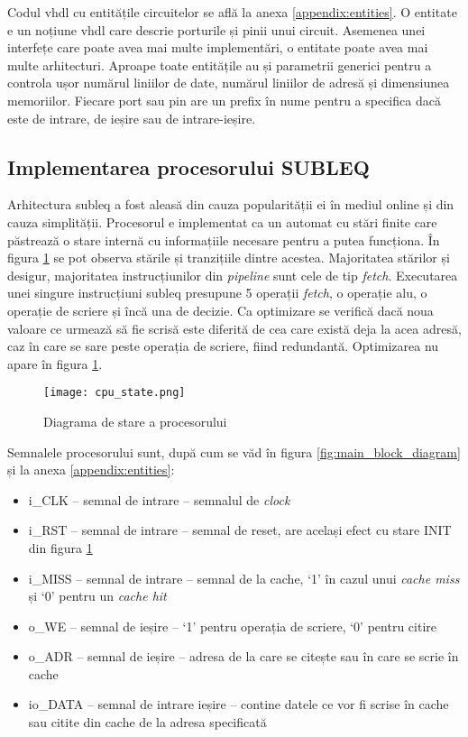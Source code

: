 \documentclass[../main.tex]{subfiles}
\begin{document}
Codul \acrshort{vhdl} cu entitățile circuitelor se află la anexa \ref{appendix:entities}. O entitate e un noțiune \acrshort{vhdl}
care descrie porturile și pinii unui circuit. Asemenea unei interfețe care poate avea mai multe implementări, o entitate poate
avea mai multe arhitecturi. Aproape toate entitățile au și parametrii generici pentru a controla ușor numărul liniilor de date,
numărul liniilor de adresă și dimensiunea memoriilor. Fiecare port sau pin are un prefix în nume pentru a specifica dacă este
de intrare, de ieșire sau de intrare-ieșire.

\subsection{Implementarea procesorului SUBLEQ}
Arhitectura \acrshort{subleq} a fost aleasă din cauza popularității ei în mediul online și din cauza simplității.
Procesorul e implementat ca un automat cu stări finite care păstrează o stare internă cu informațiile necesare
pentru a putea funcționa. În figura \ref{fig:cpu_state} se pot observa stările și tranzițiile dintre acestea.
Majoritatea stărilor și desigur, majoritatea instrucțiunilor din \emph{pipeline} sunt cele de tip \emph{fetch}.
Executarea unei singure instrucțiuni \acrshort{subleq} presupune 5 operații \emph{fetch}, o operație \acrshort{alu},
o operație de scriere și încă una de decizie. Ca optimizare se verifică dacă noua valoare ce urmează să fie scrisă
este diferită de cea care există deja la acea adresă, caz în care se sare peste operația de scriere, fiind
redundantă. Optimizarea nu apare în figura \ref{fig:cpu_state}.

\begin{figure}[h]
    \centering
    \texttt{[image: cpu\_state.png]}
    \caption{Diagrama de stare a procesorului}
    \label{fig:cpu_state}
\end{figure}

Semnalele procesorului sunt, după cum se văd în figura \ref{fig:main_block_diagram} și la anexa \ref{appendix:entities}:
\begin{itemize}
    \item i\_CLK -- semnal de intrare -- semnalul de \emph{clock}
    \item i\_RST -- semnal de intrare -- semnal de reset, are același efect cu stare INIT din figura \ref{fig:cpu_state}
    \item i\_MISS -- semnal de intrare -- semnal de la cache, `1' în cazul unui \emph{cache miss} și `0' pentru un \emph{cache hit}
    \item o\_WE -- semnal de ieșire -- `1' pentru operația de scriere, `0' pentru citire
    \item o\_ADR -- semnal de ieșire -- adresa de la care se citește sau în care se scrie în cache
    \item io\_DATA -- semnal de intrare ieșire -- contine datele ce vor fi scrise în cache sau citite din cache de la 
    adresa specificată
\end{itemize}
\end{document}

